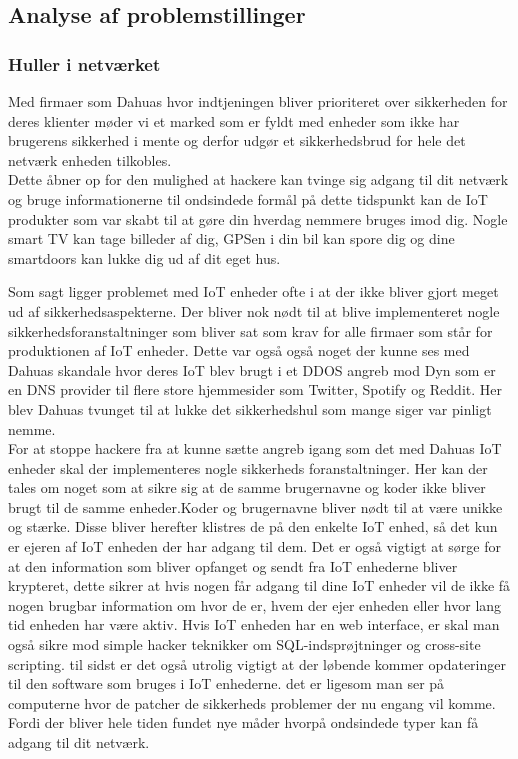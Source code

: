     \subsection{Analyse af problemstillinger}
    
        \subsubsection{Huller i netværket}
        Med firmaer som Dahuas hvor indtjeningen bliver prioriteret over sikkerheden for deres klienter møder vi et marked som er fyldt med enheder som ikke har brugerens sikkerhed i mente og derfor udgør et sikkerhedsbrud for hele det netværk enheden tilkobles.\\ 
        Dette åbner op for den mulighed at hackere kan tvinge sig adgang til dit netværk og bruge informationerne til ondsindede formål på dette tidspunkt kan de IoT produkter som var skabt til at gøre din hverdag nemmere bruges imod dig. Nogle smart TV kan tage billeder af dig, GPSen i din bil kan spore dig og dine smartdoors kan lukke dig ud af dit eget hus.\\ 
        
        
        Som sagt ligger problemet med IoT enheder ofte i at der ikke bliver gjort meget ud af sikkerhedsaspekterne. Der bliver nok nødt til at blive implementeret nogle sikkerhedsforanstaltninger som bliver sat som krav for alle firmaer som står for produktionen af IoT enheder. Dette var også også noget der kunne ses med Dahuas skandale hvor deres IoT blev brugt i et DDOS angreb mod Dyn som er en DNS provider til flere store hjemmesider som Twitter, Spotify og Reddit. Her blev Dahuas tvunget til at lukke det sikkerhedshul som mange siger var pinligt nemme.\\ 
            For at stoppe hackere fra at kunne sætte angreb igang som det med Dahuas IoT enheder skal der implementeres nogle sikkerheds foranstaltninger. Her  kan der tales om noget som at sikre sig at de samme brugernavne og koder ikke bliver brugt til de samme enheder.Koder og brugernavne bliver nødt til at være unikke og stærke. Disse bliver herefter klistres de på den enkelte IoT enhed, så det kun er ejeren af IoT enheden der har adgang til dem. Det er også vigtigt at sørge for at den information som bliver opfanget og sendt fra IoT enhederne bliver krypteret, dette sikrer at hvis nogen får adgang til dine IoT enheder vil de ikke få nogen brugbar information om hvor de er, hvem der ejer enheden eller hvor lang tid enheden har være aktiv. Hvis IoT enheden har en web interface, er skal man også sikre mod simple hacker teknikker om SQL-indsprøjtninger og cross-site scripting. til sidst er det også utrolig vigtigt at der løbende kommer opdateringer til den software som bruges i IoT enhederne. det er ligesom man ser på computerne hvor de patcher de sikkerheds problemer der nu engang vil komme. Fordi der bliver hele tiden fundet nye måder hvorpå ondsindede typer kan få adgang til dit netværk.\autocite{Ref10}\\  
        
